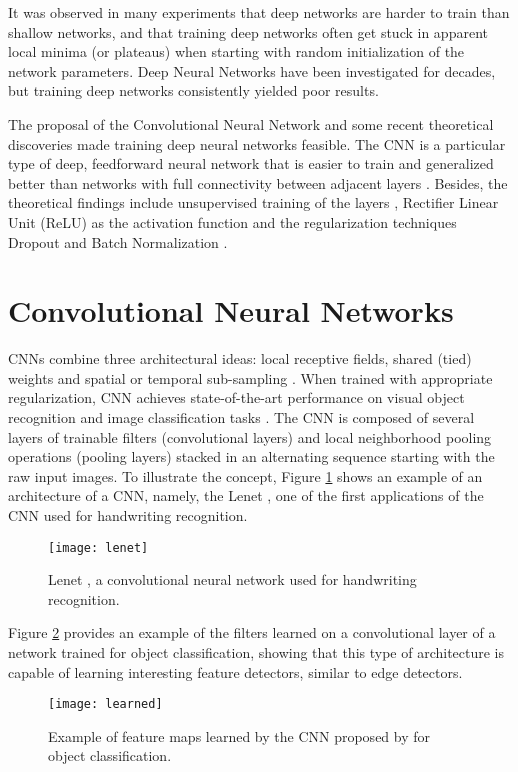 It was observed in many experiments that deep networks are harder to train than shallow networks, and that training deep networks often get stuck in apparent local minima (or plateaus) when starting with random initialization of the network parameters. Deep Neural Networks have been investigated for decades, but training deep networks consistently yielded poor results. 

The proposal of the Convolutional Neural Network \cite{lecun1995convolutional} and some recent theoretical discoveries made training deep neural networks feasible. The CNN is a particular type of deep, feedforward neural network that is easier to train and generalized better than networks with full connectivity between adjacent layers \cite{lecun2015deep}. Besides, the theoretical findings include unsupervised training of the layers \cite{hinton2006fast}, Rectifier Linear Unit (ReLU) \cite{nair2010rectified} as the activation function and the regularization techniques Dropout \cite{srivastava2014dropout} and Batch Normalization \cite{ioffe2015batch}. 


\section{Convolutional Neural Networks}
CNNs combine three architectural ideas: local receptive fields, shared
(tied) weights and spatial or temporal sub-sampling \cite{lecun1998gradient}. When trained with appropriate regularization, CNN achieves state-of-the-art performance
on visual object recognition and image classification tasks \cite{lecun2015deep}. The CNN is composed of several layers of trainable filters (convolutional layers) and local neighborhood pooling operations (pooling layers) stacked in an alternating sequence starting with the raw input images. To illustrate the concept, Figure \ref{lenet} shows an example of an architecture of a CNN, namely, the Lenet \cite{lecun1998gradient}, one of the first applications of the CNN used for handwriting recognition.

\begin{figure}[!htb]
\centering
\texttt{[image: lenet]}
\caption{Lenet \cite{lecun1998gradient}, a convolutional neural network used for handwriting recognition.}
\label{lenet}
\end{figure}

Figure \ref{learned} provides an example of the filters learned on a convolutional layer of a network trained for object classification, showing that this type of architecture is
capable of learning interesting feature detectors, similar to edge detectors.
\begin{figure}[!htb]
\centering
\texttt{[image: learned]}
\caption{Example of feature maps learned by the CNN proposed by \cite{krizhevsky2012imagenet} for object classification.}
\label{learned}
\end{figure}


